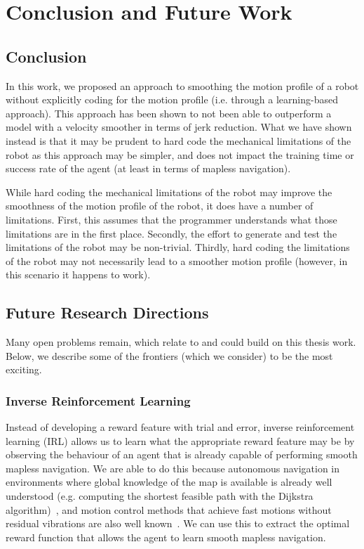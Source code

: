 \chapter{Conclusion and Future Work}
\label{ch:concl}

\section{Conclusion}

In this work, we proposed an approach to smoothing the motion profile of a robot without explicitly coding for the motion profile (i.e. through a learning-based approach). This approach has been shown to not been able to outperform a model with a velocity smoother in terms of jerk reduction. What we have shown instead is that it may be prudent to hard code the mechanical limitations of the robot as this approach may be simpler, and does not impact the training time or success rate of the agent (at least in terms of mapless navigation).

While hard coding the mechanical limitations of the robot may improve the smoothness of the motion profile of the robot, it does have a number of limitations. First, this assumes that the programmer understands what those limitations are in the first place. Secondly, the effort to generate and test the limitations of the robot may be non-trivial. Thirdly, hard coding the limitations of the robot may not necessarily lead to a smoother motion profile (however, in this scenario it happens to work).

\section{Future Research Directions}
Many open problems remain, which relate to and could build on this thesis work. Below, we describe some of the frontiers (which we consider) to be the most exciting.

\subsection{Inverse Reinforcement Learning}
Instead of developing a reward feature with trial and error, inverse reinforcement learning (IRL) allows us to learn what the appropriate reward feature may be by observing the behaviour of an agent that is already capable of performing smooth mapless navigation. We are able to do this because autonomous navigation in environments where global knowledge of the map is available is already well understood (e.g. computing the shortest feasible path with the Dijkstra algorithm)~\cite{lavalle_planning_2006}, and motion control methods that achieve fast motions without residual vibrations are also well known~\cite{meckl_optimized_1998}. We can use this to extract the optimal reward function that allows the agent to learn smooth mapless navigation.

